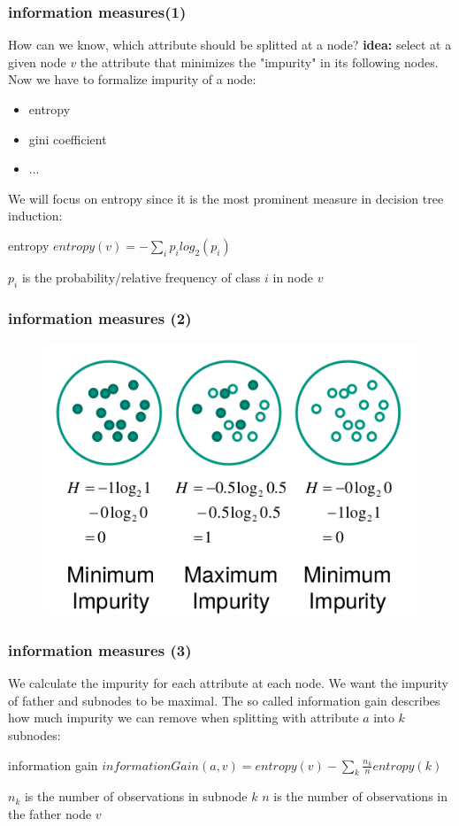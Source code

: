\documentclass{beamer}
\begin{document}
\begin{frame}
\frametitle{information measures(1)}
How can we know, which attribute should be splitted at a node?
\newline
\textbf{idea:} select at a given node $v$ the attribute that minimizes the "impurity" in its following nodes.
\newline
Now we have to formalize impurity of a node:
\begin{itemize}
\item entropy
\item gini coefficient
\item ...
\end{itemize}
We will focus on entropy since it is the most prominent measure in decision tree induction:
\begin{block}{entropy}
$entropy(v) = -\sum_{i} p_i log_2(p_i)$
\end{block}
$p_i$ is the probability/relative frequency of class $i$ in node $v$
\end{frame} 

\begin{frame}
\frametitle{information measures (2)}
\begin{figure}
\includegraphics[width = 0.5\linewidth]{figures/04/01_classification/entropy.png}
\end{figure}


\end{frame}

\begin{frame}
\frametitle{information measures (3)}
We calculate the impurity for each attribute at each node. We want the impurity of father and subnodes to be maximal. The so called information gain describes how much impurity we can remove when splitting with attribute $a$ into $k$ subnodes:
\begin{block}{information gain}
$informationGain(a,v) = entropy(v) - \sum_k \frac{n_k}{n} entropy(k)$
\end{block}
$n_k$ is the number of observations in subnode $k$
\newline
$n$ is the number of observations in the father node $v$
\end{frame}
\end{document}
